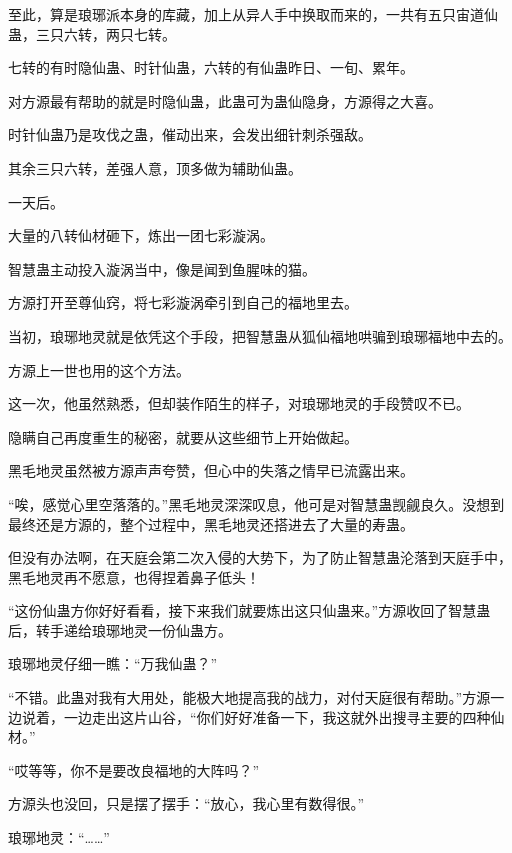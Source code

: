 \begin{this_body}
至此，算是琅琊派本身的库藏，加上从异人手中换取而来的，一共有五只宙道仙蛊，三只六转，两只七转。

七转的有时隐仙蛊、时针仙蛊，六转的有仙蛊昨日、一旬、累年。

对方源最有帮助的就是时隐仙蛊，此蛊可为蛊仙隐身，方源得之大喜。

时针仙蛊乃是攻伐之蛊，催动出来，会发出细针刺杀强敌。

其余三只六转，差强人意，顶多做为辅助仙蛊。

一天后。

大量的八转仙材砸下，炼出一团七彩漩涡。

智慧蛊主动投入漩涡当中，像是闻到鱼腥味的猫。

方源打开至尊仙窍，将七彩漩涡牵引到自己的福地里去。

当初，琅琊地灵就是依凭这个手段，把智慧蛊从狐仙福地哄骗到琅琊福地中去的。

方源上一世也用的这个方法。

这一次，他虽然熟悉，但却装作陌生的样子，对琅琊地灵的手段赞叹不已。

隐瞒自己再度重生的秘密，就要从这些细节上开始做起。

黑毛地灵虽然被方源声声夸赞，但心中的失落之情早已流露出来。

“唉，感觉心里空落落的。”黑毛地灵深深叹息，他可是对智慧蛊觊觎良久。没想到最终还是方源的，整个过程中，黑毛地灵还搭进去了大量的寿蛊。

但没有办法啊，在天庭会第二次入侵的大势下，为了防止智慧蛊沦落到天庭手中，黑毛地灵再不愿意，也得捏着鼻子低头！

“这份仙蛊方你好好看看，接下来我们就要炼出这只仙蛊来。”方源收回了智慧蛊后，转手递给琅琊地灵一份仙蛊方。

琅琊地灵仔细一瞧：“万我仙蛊？”

“不错。此蛊对我有大用处，能极大地提高我的战力，对付天庭很有帮助。”方源一边说着，一边走出这片山谷，“你们好好准备一下，我这就外出搜寻主要的四种仙材。”

“哎等等，你不是要改良福地的大阵吗？”

方源头也没回，只是摆了摆手：“放心，我心里有数得很。”

琅琊地灵：“……”

\end{this_body}

